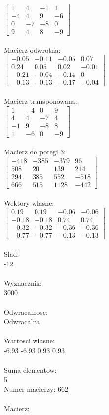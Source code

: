 \documentclass[a4paper,12pt]{article}
\begin{document}
$\begin{bmatrix} 1&4&-1&1\\-4&4&9&-6\\0&-7&-8&0\\9&4&8&-9 \end{bmatrix}$
\\
\\
Macierz odwrotna:\\

$\begin{bmatrix} -0.05&-0.11&-0.05&0.07\\0.24&0.05&0.02&-0.01\\-0.21&-0.04&-0.14&0\\-0.13&-0.13&-0.17&-0.04 \end{bmatrix}$
\\
\\
Macierz transponowana:\\

$\begin{bmatrix} 1&-4&0&9\\4&4&-7&4\\-1&9&-8&8\\1&-6&0&-9 \end{bmatrix}$
\\
\\
Macierz do potegi 3:\\

$\begin{bmatrix} -418&-385&-379&96\\508&20&139&214\\294&385&552&-518\\666&515&1128&-442 \end{bmatrix}$
\\
\\
Wektory wlasne:\\

$\begin{bmatrix} 0.19&0.19&-0.06&-0.06\\-0.18&-0.18&0.74&0.74\\-0.32&-0.32&-0.36&-0.36\\-0.77&-0.77&-0.13&-0.13 \end{bmatrix}$
\\
\\
Slad:\\
-12
\\
\\
Wyznacznik:\\
3000
\\
\\
Odwracalnosc:\\
Odwracalna
\\
\\
Wartosci wlasne:\\
-6.93 -6.93 0.93 0.93
\\
\\
Suma elementow:\\
5
\\
\newpage
Numer macierzy:
662
\\
\\
Macierz:\\
\end{document}
